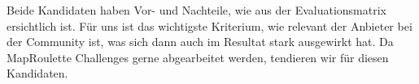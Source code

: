 Beide Kandidaten haben Vor- und Nachteile, wie aus der Evaluationsmatrix ersichtlich ist. Für uns ist das wichtigste Kriterium, wie relevant der Anbieter bei der Community ist, was sich dann auch im Resultat stark ausgewirkt hat. Da MapRoulette Challenges gerne abgearbeitet werden, tendieren wir für diesen Kandidaten.  